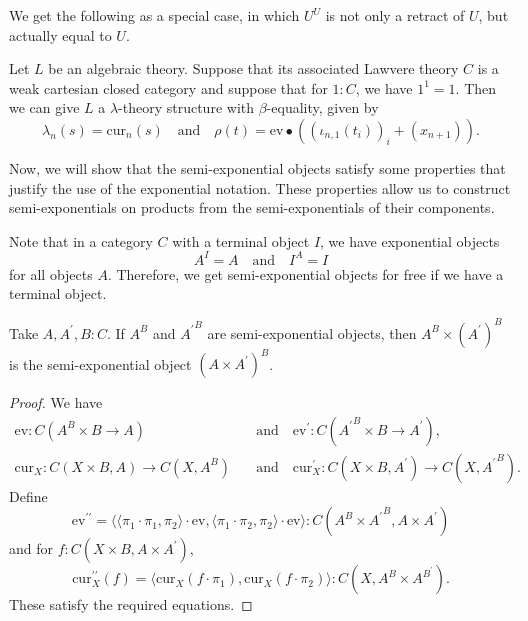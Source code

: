 We get the following as a special case, in which $ U^U $ is not only a retract of $ U $, but actually equal to $ U $.
\begin{corollary}
  Let $ L $ be an algebraic theory. Suppose that its associated Lawvere theory $ C $ is a weak cartesian closed category and suppose that for $ 1 : C $, we have $ 1^1 = 1 $. Then we can give $ L $ a $ \lambda $-theory structure with $ \beta $-equality, given by
  \[ \lambda_n(s) = \mathrm{cur}_n(s) \quad \text{and} \quad \rho(t) = \mathrm{ev} \bullet ((\iota_{n, 1}(t_i))_i + (x_{n + 1})). \]
\end{corollary}

Now, we will show that the semi-exponential objects satisfy some properties that justify the use of the exponential notation. These properties allow us to construct semi-exponentials on products from the semi-exponentials of their components.
\begin{remark}
  Note that in a category $ C $ with a terminal object $ I $, we have exponential objects
  \[ A^I = A \quad \text{and} \quad I^A = I \]
  for all objects $ A $. Therefore, we get semi-exponential objects for free if we have a terminal object.
\end{remark}

\begin{lemma}
  Take $ A, A^\prime, B : C $. If $ A^B $ and $ {A^\prime}^B $ are semi-exponential objects, then $ A^B \times (A^\prime)^B $ is the semi-exponential object $ (A \times A^\prime)^B $.
\end{lemma}
\begin{proof}
  We have
  \begin{align*}
    \mathrm{ev} : C(A^B \times B \to A) \quad &\text{and} \quad \mathrm{ev}^\prime : C({A^\prime}^B \times B \to A^\prime),\\
    \mathrm{cur}_X: C(X \times B, A) \to C(X, A^B) \quad &\text{and} \quad \mathrm{cur}^\prime_X: C(X \times B, A^\prime) \to C(X, {A^\prime}^B).
  \end{align*}
  Define
  \[ \mathrm{ev}^{\prime \prime} = \langle \langle \pi_1 \cdot \pi_1, \pi_2 \rangle \cdot \mathrm{ev}, \langle \pi_1 \cdot \pi_2, \pi_2 \rangle \cdot \mathrm{ev} \rangle : C(A^B \times {A^\prime}^B, A \times A^\prime) \]
  and for $ f: C(X \times B, A \times A^\prime) $,
  \[ \mathrm{cur}^{\prime \prime}_X(f) = \langle \mathrm{cur}_X(f \cdot \pi_1), \mathrm{cur}_X(f \cdot \pi_2) \rangle : C(X, A^B \times A^{B^\prime}). \]
  These satisfy the required equations.
\end{proof}

